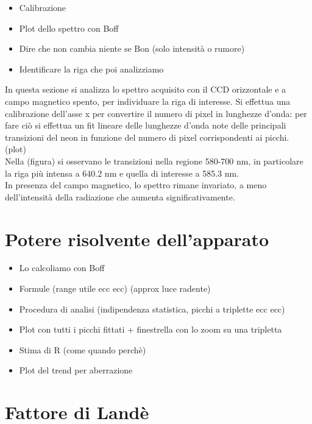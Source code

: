 \documentclass[twocolumn,10pt]{asme2ej}
\begin{document}
\begin{itemize}
    \item Calibrazione
    \item Plot dello spettro con Boff
    \item Dire che non cambia niente se Bon (solo intensità o rumore)
    \item Identificare la riga che poi analizziamo
\end{itemize}
In questa sezione si analizza lo spettro acquisito con il CCD orizzontale e a campo magnetico spento, per individuare la riga di interesse. 
Si effettua una calibrazione dell'asse x per convertire il numero di pixel in lunghezze d'onda: per fare ciò si effettua un fit lineare 
delle lunghezze d'onda note delle principali transizioni del neon in funzione del numero di pixel corrispondenti ai picchi. 
(plot)\\ 
Nella (figura) si osservano le transizioni nella regione 580-700 \si{\nano \metre}, in particolare la riga più intensa 
a 640.2 \si{\nano \metre} e quella di interesse a 585.3 \si{\nano \metre}.\\
In presenza del campo magnetico, lo spettro rimane invariato, a meno dell'intensità della radiazione che aumenta significativamente. 

\section{Potere risolvente dell'apparato}

\begin{itemize}
    \item Lo calcoliamo con Boff
    \item Formule (range utile ecc ecc) (approx luce radente) 
    \item Procedura di analisi (indipendenza statistica, picchi a triplette ecc ecc)
    \item Plot con tutti i picchi fittati + finestrella con lo zoom su una tripletta
    \item Stima di R (come quando perchè)
    \item Plot del trend per aberrazione 
\end{itemize}



\section{Fattore di Landè}
\end{document}

